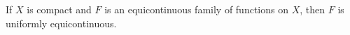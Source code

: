 If $X$ is compact and $F$ is an equicontinuous family of functions on $X$, then $F$ is uniformly equicontinuous.
